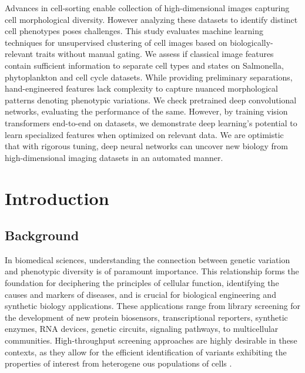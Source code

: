 \documentclass[12pt,a4paper]{article}
\begin{document}
Advances in cell-sorting enable collection of high-dimensional images capturing cell morphological diversity. However analyzing these datasets to identify distinct cell phenotypes poses challenges. This study evaluates machine learning techniques for unsupervised clustering of cell images based on biologically-relevant traits without manual gating. We assess if classical image features contain sufficient information to separate cell types and states on Salmonella, phytoplankton and cell cycle datasets. While providing preliminary separations, hand-engineered features lack complexity to capture nuanced morphological patterns denoting phenotypic variations. We check pretrained deep convolutional networks, evaluating the performance of the same. However, by training vision transformers end-to-end on datasets, we demonstrate deep learning's potential to learn specialized features when optimized on relevant data. We are optimistic that with rigorous tuning, deep neural networks can uncover new biology from high-dimensional imaging datasets in an automated manner.

\newpage
\section{Introduction}
\label{intro}

\subsection{Background}

In biomedical sciences, understanding the connection between genetic variation and phenotypic diversity is of paramount importance. This relationship forms the foundation for deciphering the principles of cellular function, identifying the causes and markers of diseases, and is crucial for biological engineering and synthetic biology applications. These applications range from library screening for the development of new protein biosensors, transcriptional reporters, synthetic enzymes, RNA devices, genetic circuits, signaling pathways, to multicellular communities. High-throughput screening approaches are highly desirable in these contexts, as they allow for the efficient identification of variants exhibiting the properties of interest from heterogene       ous populations of cells \cite{Pegoraro2017-rs}.
\end{document}
